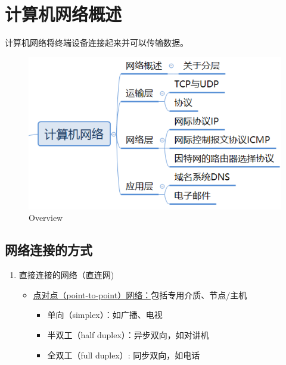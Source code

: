 \section{计算机网络概述}

计算机网络将终端设备连接起来并可以传输数据。
\begin{figure}[]
	\centering
	\includegraphics[width=0.85\columnwidth]{pic/overview.png}
	\caption{Overview}
	\label{fig:kernelcore}
\end{figure}

\subsection{网络连接的方式}
\begin{enumerate}
\item 直接连接的网络（直连网)
\begin{itemize}
\item \underline{点对点（point-to-point）网络：}包括专用介质、节点/主机
\begin{itemize}
	\item 单向（simplex）：如广播、电视
	\item 半双工（half duplex）：异步双向，如对讲机
	\item 全双工（full duplex）: 同步双向，如电话
\end{itemize}
\end{itemize}
\end{enumerate}

